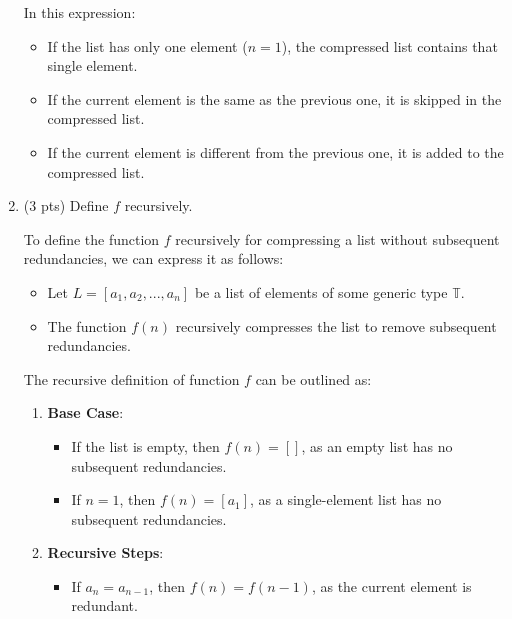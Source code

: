 \documentclass[12pt]{article}
\begin{document}
\begin{spacing}{1.5}
\begin{enumerate}
		In this expression:
		    
		\begin{itemize}
			\item If the list has only one element ($n = 1$), the compressed list contains that single element.
			      
			\item If the current element is the same as the previous one, it is skipped in the compressed list.
			      
			\item If the current element is different from the previous one, it is added to the compressed list.
		\end{itemize}
		
		\item (3 pts) Define $f$ recursively.
		      
		      To define the function $f$ recursively for compressing a list without subsequent redundancies, we can express it as follows: 
		      
		      \begin{itemize}
		      	\item Let $L = [a_1, a_2, ..., a_n]$ be a list of elements of some generic type $\mathbb{T}$.
		      	      
		      	\item The function $f(n)$ recursively compresses the list to remove subsequent redundancies.
		      \end{itemize}
		      
		      The recursive definition of function $f$ can be outlined as: 
		      
		      \begin{enumerate}
		      	\item \textbf{Base Case}: 
		      	      \begin{itemize}
		      	      	\item If the list is empty, then $f(n) = []$, as an empty list has no subsequent redundancies.
		      	      	                          
		      	      	\item If $n = 1$, then $f(n) = [a_1]$, as a single-element list has no subsequent redundancies.
		      	      \end{itemize}
		      	      
		      	\item \textbf{Recursive Steps}:
		      	      \begin{itemize}
		      	      	\item If $a_n = a_{n-1}$, then $f(n) = f(n-1)$, as the current element is redundant.
		      	      	      

\end{itemize}
\end{enumerate}
\end{enumerate}
\end{spacing}
\end{document}
